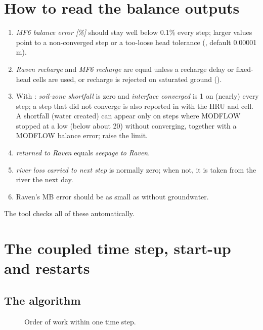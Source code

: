 \section{How to read the balance outputs}
\begin{enumerate}
\item \emph{MF6 balance error [\%]} should stay well below 0.1\% every step; larger values point to a non-converged step or a
too-loose head tolerance (, default 0.00001 m).
\item \emph{Raven recharge} and \emph{MF6 recharge} are equal unless a recharge delay or fixed-head cells are used, or
recharge is rejected on saturated ground ().
\item With : \emph{soil-zone shortfall} is zero and \emph{interface converged} is 1 on (nearly) every
step; a step that did not converge is also reported in  with the HRU and cell. A shortfall
(water created) can appear only on steps where MODFLOW stopped at a low  (below about
20) without converging, together with a MODFLOW balance error; raise the limit.
\item \emph{returned to Raven} equals \emph{seepage to Raven}.
\item \emph{river loss carried to next step} is normally zero; when not, it is taken from the river the next day.
\item Raven's  MB error should be as small as without groundwater.
\end{enumerate}
The tool  checks all of these automatically.

\section{The coupled time step, start-up and restarts}\label{ch:timestep}
\subsection{The algorithm}
\begin{figure}[!htbp]\centering
{}
\caption{Order of work within one time step.}\label{fig:timeline}
\end{figure}

